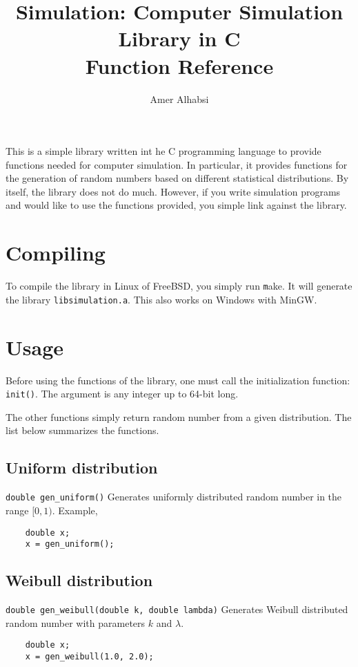 \documentclass{article}
\title{Simulation: Computer Simulation Library in C\\Function Reference}
\author{Amer Alhabsi}
\begin{document}
\maketitle
This is a simple library written int he C programming language to provide functions needed for computer simulation. In particular, it provides functions for the generation of random numbers based on different statistical distributions. By itself, the library does not do much. However, if you write simulation programs and would like to use the functions provided, you simple link against the library.
\section{Compiling}
To compile the library in Linux of FreeBSD, you simply run {\texttt make}. It will generate the library \texttt{libsimulation.a}. This also works on Windows with MinGW.
\section{Usage}
Before using the functions of the library, one must call the initialization function: \texttt{init()}. The argument is any integer up to 64-bit long.

The other functions simply return random number from a given distribution. The list below summarizes the functions.

\subsection{Uniform distribution}
    \texttt{double gen\_uniform()}  Generates uniformly distributed random number in the range $[0, 1)$. Example,
\begin{verbatim}
    double x;
    x = gen_uniform();
\end{verbatim}
\subsection{Weibull distribution}    
\texttt{double gen\_weibull(double k, double lambda)}  Generates Weibull distributed random number with parameters $k$ and $\lambda$.
\begin{verbatim}
    double x;
    x = gen_weibull(1.0, 2.0);
\end{verbatim}
\end{document}
